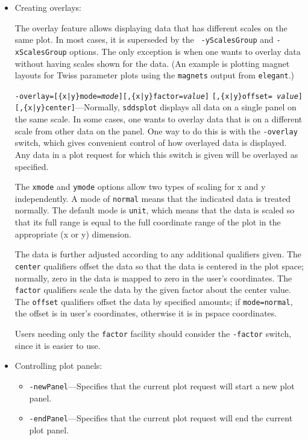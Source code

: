 \begin{itemize}
\begin{itemize}
\begin{itemize}
  \end{itemize}

\item Creating overlays:

The overlay feature allows displaying data that has different scales
on the same plot.  In most cases, it is superseded by the {\tt
-yScalesGroup} and {\tt -xScalesGroup} options.  The only exception is
when one wants to overlay data without having scales shown for the
data.  (An example is plotting magnet layouts for Twiss parameter
plots using the {\tt magnets} output from {\tt elegant}.)

{\tt -overlay=[\{x|y\}mode={\em mode}][,\{x|y\}factor={\em value}]} {\tt [,\{x|y\}offset={\em
value}]} {\tt [,\{x|y\}center]}---Normally, {\tt sddsplot} displays all data on a single panel on the same
scale.  In some cases, one wants to overlay data that is on a different scale from other data on the
panel.  One way to do this is with the {\tt -overlay} switch, which gives convenient control of how
overlayed data is displayed.  Any data in a plot request for which this switch is given will be
overlayed as specified.

The {\tt xmode} and {\tt ymode} options allow two types of scaling for x and y independently.  A mode
of {\tt normal} means that the indicated data is treated normally.  The default mode is {\tt unit},
which means that the data is scaled so that its full range is equal to the full coordinate range of
the plot in the appropriate (x or y) dimension.

The data is further adjusted according to any additional qualifiers given.  The {\tt center}
qualifiers offset the data so that the data is centered in the plot space; normally, zero in the data
is mapped to zero in the user's coordinates.  The {\tt factor} qualifiers scale the data by the given
factor about the center value.  The {\tt offset} qualifiers offset the data by specified amounts; if
{\tt mode=normal}, the offset is in user's coordinates, otherwise it is in pspace coordinates.

Users needing only the {\tt factor} facility should consider the {\tt -factor} switch, since it is
easier to use.

\item Controlling plot panels:
  \begin{itemize}
  \item {\tt -newPanel}---Specifies that the current plot request will start a new plot panel.
  \item {\tt -endPanel}---Specifies that the current plot request will end the current plot panel.


\end{itemize}
\end{itemize}
\end{itemize}
